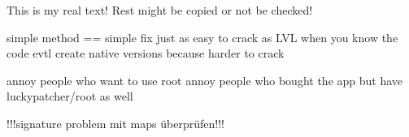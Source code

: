 This is my real text! Rest might be copied or not be checked!

simple method == simple fix
just as easy to crack as LVL when you know the code
evtl create native versions because harder to crack

annoy people who want to use root
annoy people who bought the app but have luckypatcher/root as well


!!!signature problem  mit maps überprüfen!!!
